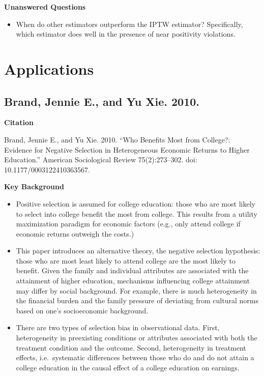 \documentclass[
]{book}
\providecommand{\tightlist}{%
  \setlength{\itemsep}{0pt}\setlength{\parskip}{0pt}}
\begin{document}
\textbf{Unanswered Questions}

\begin{itemize}
\tightlist
\item
  When do other estimators outperform the IPTW estimator? Specifically, which estimator does well in the presence of near positivity violations.
\end{itemize}

\hypertarget{applications}{%
\section{Applications}\label{applications}}

\hypertarget{brand-jennie-e.-and-yu-xie.-2010.}{%
\subsection*{Brand, Jennie E., and Yu Xie. 2010.}\label{brand-jennie-e.-and-yu-xie.-2010.}}

\textbf{Citation}

Brand, Jennie E., and Yu Xie. 2010. ``Who Benefits Most from College?: Evidence for Negative Selection in Heterogeneous Economic Returns to Higher Education.'' American Sociological Review 75(2):273--302. doi: 10.1177/0003122410363567.

\textbf{Key Background}

\begin{itemize}
\tightlist
\item
  Positive selection is assumed for college education: those who are most likely to select into college benefit the most from college. This results from a utility maximization paradigm for economic factors (e.g., only attend college if economic returns outweigh the costs.)
\item
  This paper introduces an alternative theory, the negative selection hypothesis: those who are most least likely to attend college are the most likely to benefit. Given the family and individual attributes are associated with the attainment of higher education, mechanisms influencing college attainment may differ by social background. For example, there is much heterogeneity in the financial burden and the family pressure of deviating from cultural norms based on one's socioeconomic background.
\item
  There are two types of selection bias in observational data. First, heterogeneity in preexisting conditions or attributes associated with both the treatment condition and the outcome. Second, heterogeneity in treatment effects, i.e.~systematic differences between those who do and do not attain a college education in the causal effect of a college education on earnings.
\end{itemize}
\end{document}
